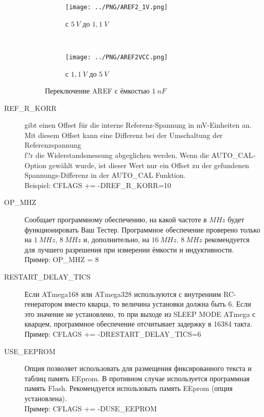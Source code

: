 \begin{description}
\begin{figure}[H]
  \begin{subfigure}[b]{.5\textwidth}
    \centering
    \texttt{[image: ../PNG/AREF2\_1V.png]}
    \caption{с \(5~V\) до \(1,1~V\)}
    \label{pic:aref1}
  \end{subfigure}
  ~
  \begin{subfigure}[b]{.5\textwidth}
    \centering
    \texttt{[image: ../PNG/AREF2VCC.png]}
    \caption{с \(1,1~V\) до \(5~V\)}
    \label{pic:aref5}
  \end{subfigure}
  \caption{Переключение AREF с ёмкостью \(1~nF\)}
\end{figure}
  \item[REF\_R\_KORR] gibt einen Offset für die interne Referenz-Spannung in mV-Einheiten an.
Mit diesem Offset kann eine Differenz bei der Umschaltung der Referenzspannung\\
f?r die Widerstandsmessung abgeglichen werden.
Wenn die AUTO\_CAL-Option gewählt wurde, ist dieser Wert nur ein Offset zu der gefundenen Spannungs-Differenz in der
AUTO\_CAL Funktion.\\
Beispiel: CFLAGS += -DREF\_R\_KORR=10

  \item[OP\_MHZ] Сообщает программному обеспечению, на какой частоте в \(MHz\) будет функционировать Ваш Тестер. 
Программное обеспечение проверено только на \(1~MHz\), \(8~MHz\) и, дополнительно, на \(16~MHz\). \(8~MHz\) 
рекомендуется для лучшего разрешения при измерении ёмкости и индуктивности.\\
Пример: OP\_MHZ = 8

  \item[RESTART\_DELAY\_TICS] Если ATmega168 или ATmega328 используются с внутренним RC-генератором вместо кварца, 
то величина установки должна быть 6. Если это значение не установлено, то при выходе из SLEEP MODE ATmega с 
кварцем, программное обеспечение отсчитывает задержку в 16384 такта.\\
Пример: CFLAGS += -DRESTART\_DELAY\_TICS=6

  \item[USE\_EEPROM] Опция позволяет использовать для размещения фиксированного текста и таблиц память EEprom. 
В противном случае используется программная память Flash. Рекомендуется использовать память 
EEprom (опция установлена).\\
Пример: CFLAGS += -DUSE\_EEPROM


\end{description}
